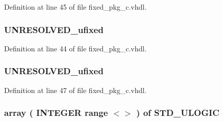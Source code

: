 Definition at line 45 of file fixed\+\_\+pkg\+\_\+c.\+vhdl.

\hypertarget{classfixed__pkg_adf035861826c6e6f4511e21b904f553f}{}
\subsubsection[{U\+\_\+ufixed}]{ {\bfseries {\bfseries {\bf U\+N\+R\+E\+S\+O\+L\+V\+E\+D\+\_\+ufixed}} \textcolor{vhdlchar}{ }} \hspace{0.3cm}{\ttfamily [Subtype]}}\label{classfixed__pkg_adf035861826c6e6f4511e21b904f553f}


Definition at line 44 of file fixed\+\_\+pkg\+\_\+c.\+vhdl.

\hypertarget{classfixed__pkg_ac19c9d4a114e6044c82c35cc40221922}{}
\subsubsection[{ufixed}]{ {\bfseries {\bfseries {\bf U\+N\+R\+E\+S\+O\+L\+V\+E\+D\+\_\+ufixed}} \textcolor{vhdlchar}{ }} \hspace{0.3cm}{\ttfamily [Subtype]}}\label{classfixed__pkg_ac19c9d4a114e6044c82c35cc40221922}


Definition at line 47 of file fixed\+\_\+pkg\+\_\+c.\+vhdl.

\hypertarget{classfixed__pkg_aa723b28a027c3c0f9bca02d75e8df4d6}{}
\subsubsection[{U\+N\+R\+E\+S\+O\+L\+V\+E\+D\+\_\+sfixed}]{ {\bfseries \textcolor{keywordflow}{array}\textcolor{vhdlchar}{ }\textcolor{vhdlchar}{(}\textcolor{vhdlchar}{ }\textcolor{comment}{I\+N\+T\+E\+G\+E\+R}\textcolor{vhdlchar}{ }\textcolor{keywordflow}{range}\textcolor{vhdlchar}{ }\textcolor{vhdlchar}{$<$$>$}\textcolor{vhdlchar}{ }\textcolor{vhdlchar}{)}\textcolor{vhdlchar}{ }\textcolor{vhdlchar}{ }\textcolor{keywordflow}{of}\textcolor{vhdlchar}{ }\textcolor{comment}{S\+T\+D\+\_\+\+U\+L\+O\+G\+I\+C}\textcolor{vhdlchar}{ }} \hspace{0.3cm}{\ttfamily [Type]}}\label{classfixed__pkg_aa723b28a027c3c0f9bca02d75e8df4d6}


